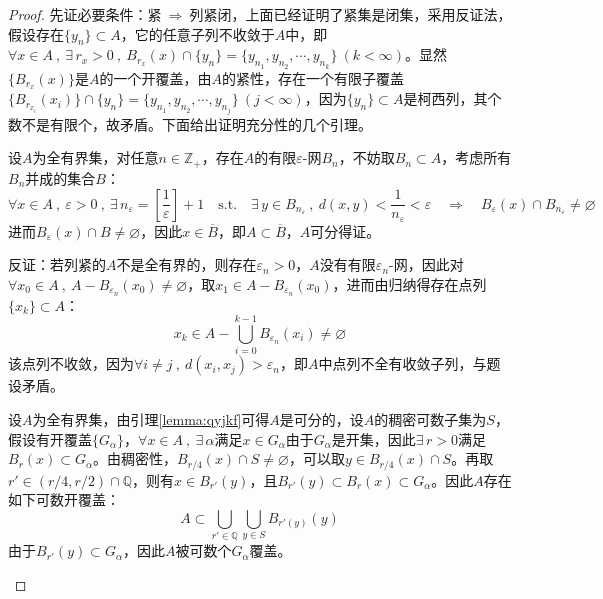 \begin{proof}
先证必要条件：紧$ \ \Rightarrow \ $列紧闭，上面已经证明了紧集是闭集，采用反证法，假设存在$\{y_n\} \subset A$，它的任意子列不收敛于$A$中，即$\forall x \in A \ , \ \exists \, r_x>0 \ , \ B_{r_x}(x) \cap \{y_n\}=\{y_{n_1},y_{n_2},\cdots,y_{n_k}\} \ (k<\infty)$。显然$\{B_{r_x}(x)\}$是$A$的一个开覆盖，由$A$的紧性，存在一个有限子覆盖$\{B_{r_{x_i}}(x_i)\}\cap \{y_n\}=\{y_{n_1},y_{n_2},\cdots,y_{n_j}\} \ (j<\infty)$，因为$\{y_n\} \subset A$是柯西列，其个数不是有限个，故矛盾。下面给出证明充分性的几个引理。

\begin{proposition}[全有界集是可分的]\label{lemma:qyjkf}
设$A$为全有界集，对任意$n \in \mathbb{Z}_+$，存在$A$的有限$\varepsilon$-网$B_n$，不妨取$B_n \subset A$，考虑所有$B_n$并成的集合$B$：
\[\forall x \in A \ , \ \varepsilon>0 \ , \ \exists \, n_{\varepsilon}=\left[\frac{1}{\varepsilon}\right]+1 \quad \text{s.t.} \quad \exists \, y \in B_{n_{\varepsilon}} \ , \ d(x,y)<\frac{1}{n_{\varepsilon}}<\varepsilon \quad \Rightarrow \quad B_{\varepsilon}(x) \cap B_{n_{\varepsilon}} \neq \varnothing\]
进而$B_{\varepsilon}(x) \cap B \neq \varnothing$，因此$x \in \overline{B}$，即$A \subset \overline{B}$，$A$可分得证。
\end{proposition}

\begin{proposition}[距离空间中的列紧集是全有界的]\label{lemma:ljqyj}
反证：若列紧的$A$不是全有界的，则存在$\varepsilon_n>0$，$A$没有有限$\varepsilon_n$-网，因此对$\forall x_0 \in A \ , \ A-B_{\varepsilon_n}(x_0) \neq \varnothing$，取$x_1 \in A-B_{\varepsilon_n}(x_0)$，进而由归纳得存在点列$\{x_k\} \subset A$：
\[x_k \in A-\bigcup_{i=0}^{k-1}B_{\varepsilon_n}(x_i) \neq \varnothing\]
该点列不收敛，因为$\forall i \neq j \ , \ d(x_i,x_j)>\varepsilon_n$，即$A$中点列不全有收敛子列，与题设矛盾。
\end{proposition}

\begin{proposition}\label{lemma:kskfg}
设$A$为全有界集，由引理\ref{lemma:qyjkf}可得$A$是可分的，设$A$的稠密可数子集为$S$，假设有开覆盖$\{G_{\alpha}\}$，$\forall x \in A \ , \ \exists \, \alpha $满足$x \in G_{\alpha}$由于$G_{\alpha}$是开集，因此$\exists \,r>0$满足$B_r(x) \subset G_{\alpha}$。由稠密性，$B_{r/4}(x) \cap S \neq \varnothing$，可以取$y \in B_{r/4}(x) \cap S$。再取$r' \in \left(r/4,r/2\right) \cap \mathbb{Q}$，则有$x \in B_{r'}(y)$，且$B_{r'}(y) \subset B_{r}(x) \subset G_{\alpha}$。因此$A$存在如下可数开覆盖：
\[A \subset \bigcup_{r' \in \mathbb{Q}}\bigcup_{y \in S}B_{r'(y)}(y)\]
由于$B_{r'}(y)\subset G_{\alpha}$，因此$A$被可数个$G_{\alpha}$覆盖。
\end{proposition}


\end{proof}
